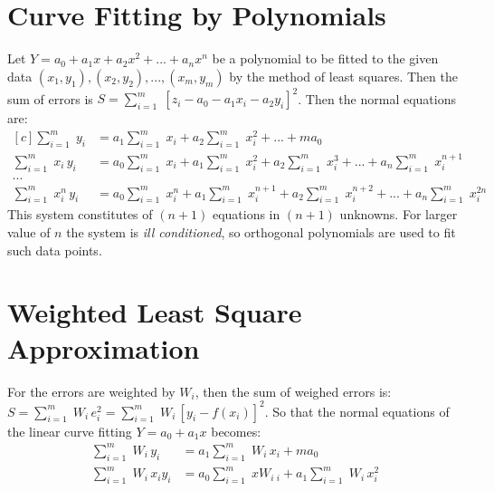 \documentclass[aima203_lecturenotes_ku.tex]{subfiles}
\begin{document}
\section{Curve Fitting by Polynomials}
Let $Y = a_0 + a_1x +a_2x^2+ ...+ a_nx^n$ be a polynomial to be fitted to the given data $(x_1,y_1), (x_2,y_2),...,(x_m,y_m)$ by the method of least squares. Then the sum of errors is $\displaystyle S = \sum_{i=1}^m \; [z_i - a_0 - a_1x_i-a_2y_i]^2$. Then the normal equations are:
\begin{equation}
  \label{polynormal}
  \begin{aligned}[c]
    \sum_{i=1}^m \; y_i &= a_1 \sum_{i=1}^m \;x_i + a_2 \sum_{i=1}^m \;x_i^2 + ...+ ma_0 \\[1mm]
    \sum_{i=1}^m \; x_i\,y_i &= a_0\sum_{i=1}^m \;x_i + a_1 \sum_{i=1}^m \;x_i^2 + a_2 \sum_{i=1}^m \;x_i^3 + ... + a_n \sum_{i=1}^m\; x_i^{n+1} \\[1mm]
    ... \\[1mm]
    \sum_{i=1}^m \; x_i^n\,y_i &= a_0\sum_{i=1}^m \;x_i^n + a_1 \sum_{i=1}^m \;x_i^{n+1} + a_2 \sum_{i=1}^m \;x_i^{n+2} + ... + a_n \sum_{i=1}^m\; x_i^{2n}
  \end{aligned}
\end{equation}
This system constitutes of $(n+1)$ equations in $(n+1)$ unknowns. For larger value of $n$ the system is \textit{ill conditioned}, so orthogonal polynomials are used to fit such data points.

\section{Weighted Least Square Approximation}
For the errors are weighted by $W_i$, then the sum of weighed errors is: \\
$\displaystyle S= \sum_{i=1} ^ m\; W_i\, e_i^2 =  \sum_{i=1} ^ m \; W_i\, [y_i - f(x_i)]^2$. So that the normal equations of the linear curve fitting $Y=a_0 +a_1x$ becomes:
\begin{equation}
\begin{aligned}
  \sum_{i=1}^m \;W_i\, y_i &= a_1 \sum_{i=1}^m \;W_i\,x_i + ma_0 \\[1mm]
  \sum_{i=1}^m \; W_i\,x_iy_i &= a_0\sum_{i=1}^m \;xW_i\,_i + a_1 \sum_{i=1}^m \;W_i\,x_i^2
\end{aligned}
\end{equation}
\end{document}
